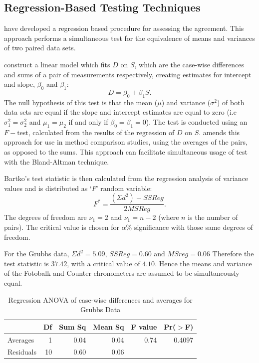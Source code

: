 \documentclass[12pt, a4paper]{report}
\theoremstyle{plain}
\theoremstyle{definition}
\theoremstyle{remark}
\begin{document}
\subsection{Regression-Based Testing Techniques}

\citet{BB89} have developed a regression based procedure for
assessing the agreement. This approach performs a simultaneous test for the equivalence of
means and variances of two paired data sets. 

\citet{BB89} construct a linear model which fits $D$ on $S$, which are the case-wise differences and sums of a pair of measurements respectively, creating estimates for intercept and slope, ${\beta}_{0}$ and ${\beta}_{1}$:
\[
D = \beta_{0} + \beta_{1}S.
\]
The null hypothesis of this test is that the mean ($\mu$) and variance
($\sigma^{2}$) of both data sets are equal if the slope and intercept estimates are equal to zero (i.e $\sigma^{2}_{1} = \sigma^{2}_{2}$ and $\mu_{1}=\mu_{2}$ if and only if $\beta_{0} = \beta_{1}=0$).
The test is conducted using an $F-$test, calculated from the results of the regression of $D$ on $S$. \citet{Bartko} amends this approach for use in method
comparison studies, using the averages of the pairs, as opposed to
the sums. This approach can facilitate simultaneous usage of test with the Bland-Altman technique.

Bartko's test statistic is then calculated from the regression analysis
of variance values \citep{BB89} and is distributed as `$F$' random
variable:
\[ F^{\ast} = \frac{(\Sigma d^{2})-SSReg}{2MSReg}.
\] The degrees of freedom are $\nu_{1}=2$ and $\nu_{1}=n-2$
(where $n$ is the number of pairs). The critical value is chosen
for $\alpha\%$ significance with those same degrees of freedom.

For the Grubbs data, $\Sigma d^{2}=5.09 $, $SSReg = 0.60$ and
$MSreg=0.06$ Therefore the test statistic is $37.42$, with a
critical value of $4.10$. Hence the means and variance of the
Fotobalk and Counter chronometers are assumed to be simultaneously
equal.

\begin{table}[ht]
	\begin{center}
		\begin{tabular}{lrrrrr}
			\hline
			& Df & Sum Sq & Mean Sq & F value & Pr($>$F) \\
			\hline
			Averages & 1 & 0.04 & 0.04 & 0.74 & 0.4097 \\
			Residuals & 10 & 0.60 & 0.06 &  &  \\
			\hline
		\end{tabular}
		\caption{Regression ANOVA of case-wise differences and averages
			for Grubbs Data}
	\end{center}
\end{table}
\end{document}
